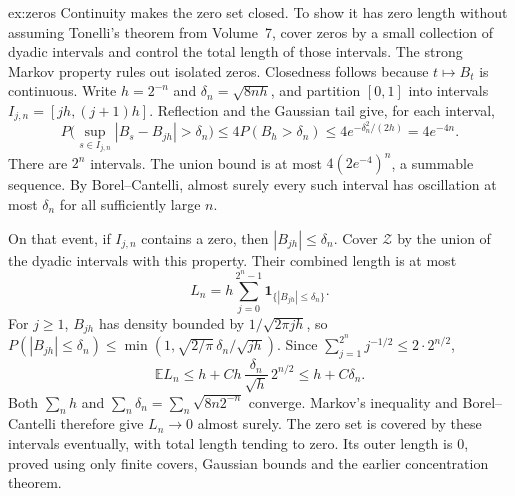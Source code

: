 \begin{solution}{ex:zeros}
\idea Continuity makes the zero set closed. To show it has zero length without assuming Tonelli's theorem from Volume~7, cover zeros by a small collection of dyadic intervals and control the total length of those intervals. The strong Markov property rules out isolated zeros.
\writeup Closedness follows because $t\mapsto B_t$ is continuous. Write $h=2^{-n}$ and $\delta_n=\sqrt{8nh}$, and partition $[0,1]$ into intervals $I_{j,n}=[jh,(j+1)h]$. Reflection and the Gaussian tail give, for each interval,
\[
 P\bigl(\sup_{s\in I_{j,n}}|B_s-B_{jh}|>\delta_n\bigr)
 \le4P(B_h>\delta_n)\le4e^{-\delta_n^2/(2h)}=4e^{-4n}.
\]
There are $2^n$ intervals. The union bound is at most $4(2e^{-4})^n$, a summable sequence. By Borel--Cantelli, almost surely every such interval has oscillation at most $\delta_n$ for all sufficiently large $n$.

On that event, if $I_{j,n}$ contains a zero, then $|B_{jh}|\le\delta_n$. Cover $\mathcal Z$ by the union of the dyadic intervals with this property. Their combined length is at most
\[
 L_n=h\sum_{j=0}^{2^n-1}\mathbf1_{\{|B_{jh}|\le\delta_n\}}.
\]
For $j\ge1$, $B_{jh}$ has density bounded by $1/\sqrt{2\pi jh}$, so $P(|B_{jh}|\le\delta_n)\le
\min(1,\sqrt{2/\pi}\,\delta_n/\sqrt{jh})$. Since $\sum_{j=1}^{2^n}j^{-1/2}\le2\cdot2^{n/2}$,
\[
 \mathbb E L_n\le h+C h\,\frac{\delta_n}{\sqrt h}\,2^{n/2}
 \le h+C\delta_n.
\]
Both $\sum_nh$ and $\sum_n\delta_n=\sum_n\sqrt{8n2^{-n}}$ converge. Markov's inequality and Borel--Cantelli therefore give $L_n\to0$ almost surely. The zero set is covered by these intervals eventually, with total length tending to zero. Its outer length is $0$, proved using only finite covers, Gaussian bounds and the earlier concentration theorem.


\end{solution}
